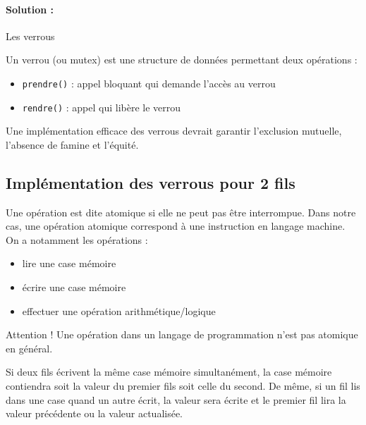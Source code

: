 \paragraph{Solution :} Les verrous

\begin{definition}
	Un verrou (ou mutex) est une structure de données permettant deux opérations : \begin{itemize}
		\item \texttt{prendre()} : appel bloquant qui demande l'accès au verrou
		\item \texttt{rendre()} : appel qui libère le verrou
	\end{itemize}
\end{definition}

\begin{proposition}
	Une implémentation efficace des verrous devrait garantir l'exclusion mutuelle, l'absence de famine et l'équité.
\end{proposition}

\subsection{Implémentation des verrous pour 2 fils}

\begin{definition}
	Une opération est dite atomique si elle ne peut pas être interrompue. Dans notre cas, une opération atomique correspond à une instruction en langage machine. On a notamment les opérations : \begin{itemize}
		\item lire une case mémoire
		\item écrire une case mémoire
		\item effectuer une opération arithmétique/logique
	\end{itemize}
\end{definition}

\begin{rem}
	Attention ! Une opération dans un langage de programmation n'est pas atomique en général.
\end{rem}

\begin{proposition}
	Si deux fils écrivent la même case mémoire simultanément, la case mémoire contiendra soit la valeur du premier fils soit celle du second. De même, si un fil lis dans une case quand un autre écrit, la valeur sera écrite et le premier fil lira la valeur précédente ou la valeur actualisée.
\end{proposition}

